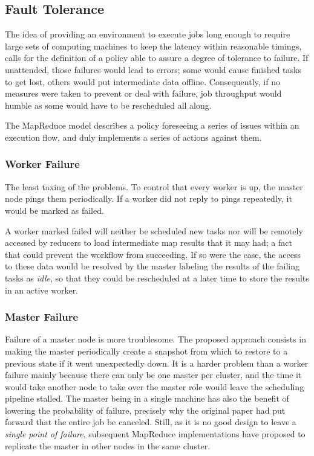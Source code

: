 \subsection{Fault Tolerance}\label{subsec:toleranciafallos}
\noindent The idea of providing an environment to execute jobs long enough to require large sets of computing machines to keep the latency within reasonable timings, calls for the definition of a policy able to assure a degree of tolerance to failure. If unattended, those failures would lead to errors; some would cause finished tasks to get lost, others would put intermediate data offline. Consequently, if no measures were taken to prevent or deal with failure, job throughput would humble as some would have to be rescheduled all along.

The MapReduce model describes a policy foreseeing a series of issues within an execution flow, and duly implements a series of actions against them.

\subsubsection{Worker Failure}\label{subsubsec:fallotrabajador}
\noindent The least taxing of the problems. To control that every worker is up, the master node pings them periodically. If a worker did not reply to pings repeatedly, it would be marked as failed.

A worker marked failed will neither be scheduled new tasks nor will be remotely accessed by reducers to load intermediate map results that it may had; a fact that could prevent the workflow from succeeding. If so were the case, the access to these data would be resolved by the master labeling the results of the failing tasks as \emph{idle}, so that they could be rescheduled at a later time to store the results in an active worker.

\subsubsection{Master Failure}\label{subsubsec:fallomaestro}
Failure of a master node is more troublesome. The proposed approach consists in making the master periodically create a snapshot from which to restore to a previous state if it went unexpectedly down. It is a harder problem than a worker failure mainly because there can only be one master per cluster, and the time it would take another node to take over the master role would leave the scheduling pipeline stalled. The master being in a single machine has also the benefit of lowering the probability of failure, precisely why the original paper \cite{googlemapreduce} had put forward that the entire job be canceled. Still, as it is no good design to leave a \emph{single point of failure}, subsequent MapReduce implementations have proposed to replicate the master in other nodes in the same cluster.

